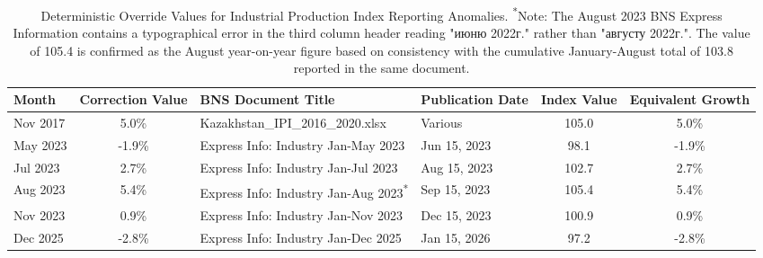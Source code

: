 \begin{table}[h]
\centering
\begin{tabular}{l c l l c c}
\hline
\textbf{Month} & \textbf{Correction Value} & \textbf{BNS Document Title} & \textbf{Publication Date} & \textbf{Index Value} & \textbf{Equivalent Growth} \\
\hline
Nov 2017 & 5.0\% & Kazakhstan\_IPI\_2016\_2020.xlsx & Various & 105.0 & 5.0\% \\
May 2023 & -1.9\% & Express Info: Industry Jan-May 2023 & Jun 15, 2023 & 98.1 & -1.9\% \\
Jul 2023 & 2.7\% & Express Info: Industry Jan-Jul 2023 & Aug 15, 2023 & 102.7 & 2.7\% \\
Aug 2023 & 5.4\% & Express Info: Industry Jan-Aug 2023\textsuperscript{*} & Sep 15, 2023 & 105.4 & 5.4\% \\
Nov 2023 & 0.9\% & Express Info: Industry Jan-Nov 2023 & Dec 15, 2023 & 100.9 & 0.9\% \\
Dec 2025 & -2.8\% & Express Info: Industry Jan-Dec 2025 & Jan 15, 2026 & 97.2 & -2.8\% \\
\hline
\end{tabular}
\caption{Deterministic Override Values for Industrial Production Index Reporting Anomalies. \textsuperscript{*}Note: The August 2023 BNS Express Information contains a typographical error in the third column header reading "июню 2022г." rather than "августу 2022г.". The value of 105.4 is confirmed as the August year-on-year figure based on consistency with the cumulative January-August total of 103.8 reported in the same document.}
\label{tab:ipi_corrections}
\end{table}